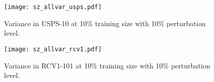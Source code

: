\documentclass[a4paper,final,notitlepage,11pt,svgnames]{article}
\newcommand{\usps}{\textsc{USPS-10}}
\newcommand{\rcv}{\textsc{RCV1-10}}
\begin{document}
\begin{figure}[!t]
  \centering
  \texttt{[image: sz\_allvar\_usps.pdf]}
  \caption{Variance in \usps{} at 10\% training size with 10\% perturbation level.\label{fig:usps_var}}
\end{figure}
\begin{figure}[!b]
  \centering
  \texttt{[image: sz\_allvar\_rcv1.pdf]}
  \caption{Variance in \rcv1{} at 10\% training size with 10\% perturbation level.\label{fig:rcv1_var}}
\end{figure}
\clearpage
\restoregeometry

\begingroup
{}
\setlength\bibitemsep{2pt}
\printbibliography
\endgroup
\end{document}
